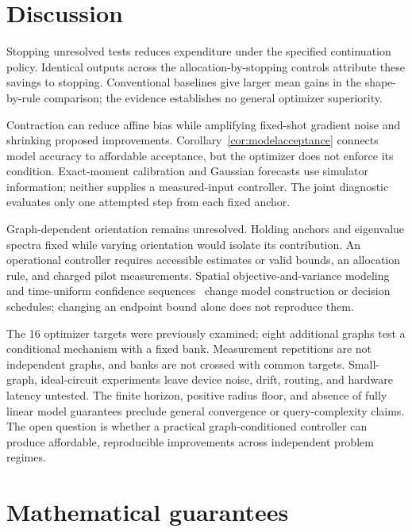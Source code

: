 \documentclass[11pt]{article}
\begin{document}
\FloatBarrier
\section{Discussion}
Stopping unresolved tests reduces expenditure under the specified
continuation policy. Identical outputs across the allocation-by-stopping
controls attribute these savings to stopping. Conventional baselines give
larger mean gains in the shape-by-rule comparison; the evidence establishes
no general optimizer superiority.

Contraction can reduce affine bias while amplifying fixed-shot gradient
noise and shrinking proposed improvements.
Corollary~\ref{cor:modelacceptance} connects model accuracy to affordable
acceptance, but the optimizer does not enforce its condition. Exact-moment
calibration and Gaussian forecasts use simulator information; neither
supplies a measured-input controller. The joint diagnostic evaluates only
one attempted step from each fixed anchor.

Graph-dependent orientation remains unresolved. Holding anchors and
eigenvalue spectra fixed while varying orientation would isolate its
contribution. An operational controller requires accessible estimates or
valid bounds, an allocation rule, and charged pilot measurements.
Spatial objective-and-variance modeling~\cite{ha2024} and time-uniform
confidence sequences~\cite{howard2021} change model construction or decision
schedules; changing an endpoint bound alone does not reproduce them.

The 16 optimizer targets were previously examined; eight additional graphs
test a conditional mechanism with a fixed bank. Measurement repetitions
are not independent graphs, and banks are not crossed with common targets.
Small-graph, ideal-circuit experiments leave device noise, drift, routing,
and hardware latency untested. The finite horizon, positive radius floor,
and absence of fully linear model guarantees preclude general convergence
or query-complexity claims. The open question is whether a practical
graph-conditioned controller can produce affordable, reproducible
improvements across independent problem regimes.

\FloatBarrier
\appendix
\section{Mathematical guarantees}
\label{sec:methods}
\end{document}
